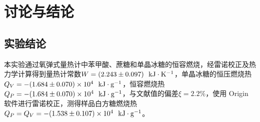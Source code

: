 \documentclass[12pt]{article}
\begin{document}
 	\section{讨论与结论}
 		\subsection{实验结论}
		 本实验通过氧弹式量热计中苯甲酸、蔗糖和单晶冰糖的恒容燃烧，经雷诺校正及热力学计算得到量热计常数$W=(2.243\pm 0.097)\ \ {\rm kJ\cdot K^{-1}}$，单晶冰糖的恒压燃烧热$Q_{V}=-(1.684\pm 0.070)\times 10^{4}\ \ {\rm kJ\cdot g^{-1}}$，恒容燃烧热$Q_{P}=-(1.684\pm 0.070)\times 10^{4}\ \ {\rm kJ\cdot g^{-1}}$，与文献值的偏差$\xi=2.2\%$，使用 Origin 软件进行雷诺校正，测得样品白方糖燃烧热$Q_{P}=Q_{V}=-(1.538\pm 0.107)\times 10^{4}\ \ {\rm kJ\cdot g^{-1}}$。

\vbox{}  


\end{document}
